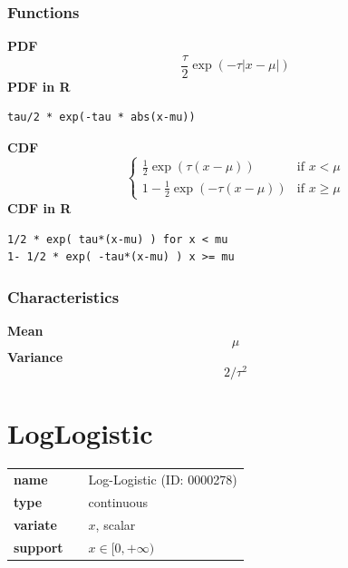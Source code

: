 \subsubsection*{Functions}

\smallskip \noindent \hspace{.2cm} \textbf{PDF} 
\begin{equation*}\frac{\tau}{2} \exp \left(-\tau|x-\mu| \right)\end{equation*}
\smallskip \noindent \hspace{.2cm} \textbf{PDF in R}  
\begin{verbatim}tau/2 * exp(-tau * abs(x-mu))\end{verbatim}
\smallskip \noindent \hspace{.2cm} \textbf{CDF} 
\begin{equation*}\begin{cases}
\frac12 \exp \left( \tau (x-\mu) \right) & \mbox{if }x < \mu \\
1-\frac12 \exp \left( -\tau (x-\mu) \right) & \mbox{if }x \geq \mu
\end{cases}\end{equation*}
\smallskip \noindent \hspace{.2cm} \textbf{CDF in R} 
\begin{verbatim}1/2 * exp( tau*(x-mu) ) for x < mu
1- 1/2 * exp( -tau*(x-mu) ) x >= mu\end{verbatim}
\smallskip
\subsubsection*{Characteristics}
\smallskip \noindent \hspace{.2cm} \textbf{Mean} 
\begin{equation*}\mu\end{equation*}
\smallskip \noindent \hspace{.2cm} \textbf{Variance} 
\begin{equation*}2 / \tau^2\end{equation*}
\smallskip
\section*{LogLogistic} 

  \bigskip 

\begin{tabular}{p{2cm}cl}
\textbf{name} & & Log-Logistic (ID: 0000278)\\ 
 
\textbf{type} & & continuous \\ 

\textbf{variate} & & $x$, scalar \\ 

\textbf{support} & & $x \in [0,+\infty)$
\end{tabular}

